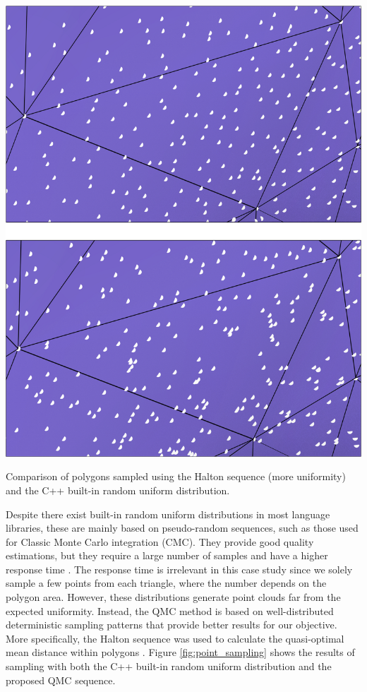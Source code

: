 \begin{marginfigure}[-5cm]
    \centering
    \includegraphics[width=\linewidth]{figs/lidar_optimization/point_sampling.png}
	\caption{Comparison of polygons sampled using the Halton sequence (more uniformity) and the C++ built-in random uniform distribution.}
	\label{fig:point_sampling}
\end{marginfigure}
Despite there exist built-in random uniform distributions in most language libraries, these are mainly based on pseudo-random sequences, such as those used for Classic Monte Carlo integration (CMC). They provide good quality estimations, but they require a large number of samples and have a higher response time \cite{marques_optimal_2019}. The response time is irrelevant in this case study since we solely sample a few points from each triangle, where the number depends on the polygon area. However, these distributions generate point clouds far from the expected uniformity. Instead, the QMC method is based on well-distributed deterministic sampling patterns that provide better results for our objective. More specifically, the Halton sequence was used to calculate the quasi-optimal mean distance within polygons \cite{burkardt_halton_2010}. Figure \ref{fig:point_sampling} shows the results of sampling with both the C++ built-in random uniform distribution and the proposed QMC sequence.

